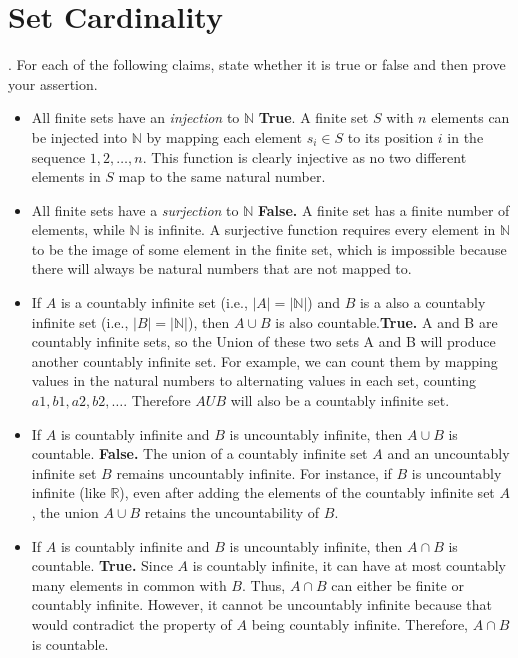 \documentclass[12pt]{article}
\def\homework{Set Cardinality}
\newcounter{quesnum}
\newcommand{\question}[2][??]{
\begin{list}{\labelitemi}{\leftmargin=2em}
\item [\arabic{quesnum}.] {} {#2}
\end{list}
\addtocounter{quesnum}{1}
}
\begin{document}
\section*{\homework}


\question[3]{
For each of the following claims, state whether it is true or false and then prove your assertion.
}

\begin{itemize}
	\item All finite sets have an \emph{injection} to $\mathbb{N}$ \textbf{True}. A finite set $S$ with $n$ elements can be injected into $\mathbb{N}$ by mapping each element $s_i \in S$ to its position $i$ in the sequence $1, 2, \ldots, n$. This function is clearly injective as no two different elements in $S$ map to the same natural number.
	\item All finite sets have a \emph{surjection} to $\mathbb{N}$
    \textbf{False.} A finite set has a finite number of elements, while $\mathbb{N}$ is infinite. A surjective function requires every element in $\mathbb{N}$ to be the image of some element in the finite set, which is impossible because there will always be natural numbers that are not mapped to.
	\item If $A$ is a countably infinite set (i.e., $|A|=|\mathbb{N}|$) and $B$ is a also a countably infinite set (i.e., $|B| = |\mathbb{N}|$), then $A \cup B$ is also countable.\textbf{True.} A and B are countably infinite sets, so the Union of these two sets A and B will produce another countably infinite set. For example, we can count them by mapping values in the natural numbers to alternating values in each set, counting $a1,b1,a2,b2, \ldots$. Therefore $A U B$ will also be a countably infinite set.

	\item If $A$ is countably infinite and $B$ is uncountably infinite, then $A \cup B$ is countable. \textbf{False.} The union of a countably infinite set $A$ and an uncountably infinite set $B$ remains uncountably infinite. For instance, if $B$ is uncountably infinite (like $\mathbb{R}$), even after adding the elements of the countably infinite set $A$, the union $A \cup B$ retains the uncountability of $B$.

	\item If $A$ is countably infinite and $B$ is uncountably infinite, then $A \cap B$ is countable. \textbf{True.} Since $A$ is countably infinite, it can have at most countably many elements in common with $B$. Thus, $A \cap B$ can either be finite or countably infinite. However, it cannot be uncountably infinite because that would contradict the property of $A$ being countably infinite. Therefore, $A \cap B$ is countable.

\end{itemize}
\end{document}
